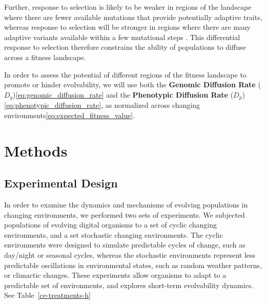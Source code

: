 \documentclass[PhD]{msu-thesis}
\begin{document}
%
%

Further, response to selection is likely to be weaker in regions of the landscape where there are fewer available mutations that provide potentially adaptive traits, whereas response to selection will be stronger in regions where there are many adaptive variants available within a few mutational steps \cite{alberch_genes_1991,carter_role_2005}. This differential response to selection therefore constrains the ability of populations to diffuse across a fitness landscape.

In order to assess the potential of different regions of the fitness landscape to promote or hinder evolvability, we will use both the \textbf{Genomic Diffusion Rate} ($D_g$)\ref{eq:genomic_diffusion_rate} and the \textbf{Phenotypic Diffusion Rate} ($D_p$)\ref{eq:phenotypic_diffusion_rate}, as normalized across changing environments\ref{eq:expected_fitness_value}.




\section{Methods}

\subsection{Experimental Design}
In order to examine the dynamics and mechanisms of evolving populations in changing environments, we performed two sets of experiments. We subjected populations of evolving digital organisms to a set of cyclic changing environments, and a set stochastic changing environments. The cyclic environments were designed to simulate predictable cycles of change, such as day/night or seasonal cycles, whereas the stochastic environments represent less predictable oscillations in environmental states, such as random weather patterns, or climactic changes. These experiments allow organisms to adapt to a predictable set of environments, and explores short-term evolvability dynamics. See Table~\ref{ce-treatments-h}
\end{document}
